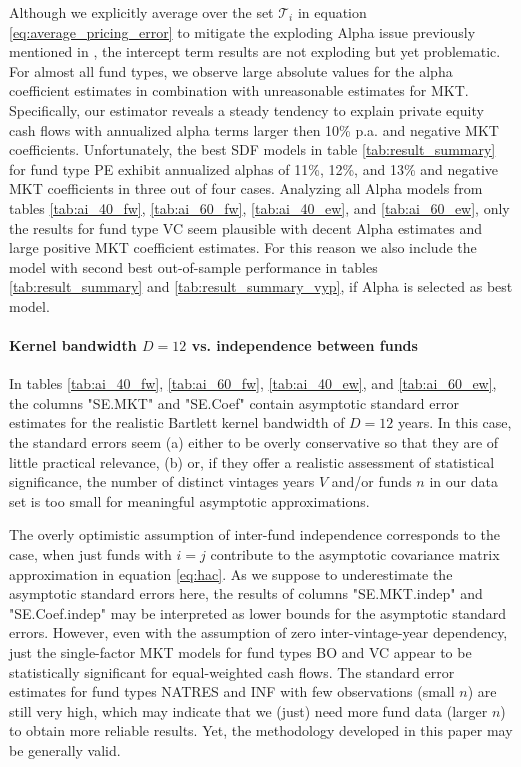 \documentclass[12pt]{article}
\begin{document}
Although we explicitly average over the set $\mathcal{T}_{i}$ in equation \ref{eq:average_pricing_error} to mitigate the exploding Alpha issue previously mentioned in \cite{DLP12}, the intercept term results are not exploding but yet problematic.
For almost all fund types, we observe large absolute values for the alpha coefficient estimates in combination with unreasonable estimates for MKT.
Specifically, our estimator reveals a steady tendency to explain private equity cash flows with annualized alpha terms larger then 10\% p.a. and negative MKT coefficients.
Unfortunately, the best SDF models in table \ref{tab:result_summary} for fund type PE exhibit annualized alphas of 11\%, 12\%, and 13\% and negative MKT coefficients in three out of four cases.
Analyzing all Alpha models from tables \ref{tab:ai_40_fw}, \ref{tab:ai_60_fw}, \ref{tab:ai_40_ew}, and  \ref{tab:ai_60_ew}, only the results for fund type VC seem plausible with decent Alpha estimates and large positive MKT coefficient estimates.
For this reason we also include the model with second best out-of-sample performance in tables \ref{tab:result_summary} and \ref{tab:result_summary_vyp}, if Alpha is selected as best model.


\paragraph{Kernel bandwidth $D=12$ vs. independence between funds}

In tables \ref{tab:ai_40_fw}, \ref{tab:ai_60_fw}, \ref{tab:ai_40_ew}, and  \ref{tab:ai_60_ew}, the columns "SE.MKT" and "SE.Coef" contain asymptotic standard error estimates for the realistic Bartlett kernel bandwidth of $D=12$ years.
In this case, the standard errors seem (a) either to be overly conservative so that they are of little practical relevance, (b) or, if they offer a realistic assessment of statistical significance, the number of distinct vintages years $V$ and/or funds $n$ in our data set is too small for meaningful asymptotic approximations.

The overly optimistic assumption of inter-fund independence corresponds to the case, when just funds with $i=j$ contribute to the asymptotic covariance matrix approximation in equation \ref{eq:hac}.
As we suppose to underestimate the asymptotic standard errors here, the results of columns "SE.MKT.indep" and "SE.Coef.indep" may be interpreted as lower bounds for the asymptotic standard errors.
However, even with the assumption of zero inter-vintage-year dependency, just the single-factor MKT models for fund types BO and VC appear to be statistically significant for equal-weighted cash flows.
The standard error estimates for fund types NATRES and INF with few observations (small $n$) are still very high, which may indicate that we (just) need more fund data (larger $n$) to obtain more reliable results.
Yet, the methodology developed in this paper may be generally valid.
\end{document}
